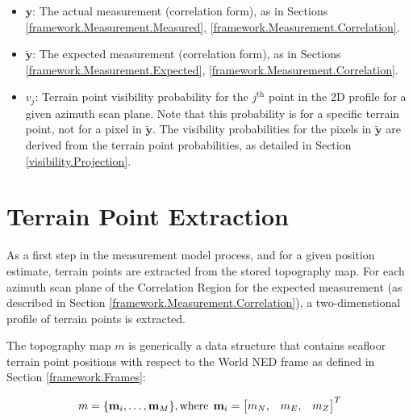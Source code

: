 \begin{itemize}
\item $\mathbf{y}$: The actual measurement (correlation form), as in Sections \ref{framework.Measurement.Measured}, \ref{framework.Measurement.Correlation}.
\item $\tilde{\mathbf{y}}$: The expected measurement (correlation form), as in Sections \ref{framework.Measurement.Expected}, \ref{framework.Measurement.Correlation}.
\item $v_j$: Terrain point visibility probability for the $j^{\text{th}}$ point in the 2D profile for a given azimuth scan plane.  
Note that this probability is for a specific terrain point, not for a pixel in $\tilde{\mathbf{y}}$.
The visibility probabilities for the pixels in $\tilde{\mathbf{y}}$ are derived from the terrain point probabilities, as detailed in Section \ref{visibility.Projection}.
\end{itemize}

\section{Terrain Point Extraction}
\label{visibility.Terrain}

As a first step in the measurement model process, and for a given position estimate, terrain points are extracted from the stored topography map.
For each azimuth scan plane of the Correlation Region for the expected measurement (as described in Section \ref{framework.Measurement.Correlation}), a two-dimenstional profile of terrain points is extracted. 

The topography map $m$ is generically a data structure that contains seafloor terrain point positions with respect to the World NED frame as defined in Section \ref{framework.Frames}:

\begin{align}
\begin{split}
m = \{ \textbf{m}_i, \hdots, \textbf{m}_M\}, \text{where} \hspace{1ex} \textbf{m}_i = \begin{bmatrix} m_N, & m_E, & m_Z \end{bmatrix}^{T}
\end{split}
\end{align}

